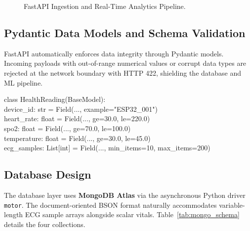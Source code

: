 \documentclass[12pt]{article}
\begin{document}
\begin{figure}[H]
\begin{tcolorbox}[tikzbox, title={FastAPI Telemetry Ingestion and Real-Time Processing Pipeline}, width=\linewidth]
{%
}
\end{tcolorbox}
\vspace{-0.2cm}
\caption{FastAPI Ingestion and Real-Time Analytics Pipeline.}
\label{fig:backend_pipeline}
\end{figure}

\subsection{Pydantic Data Models and Schema Validation}
FastAPI automatically enforces data integrity through Pydantic models. Incoming payloads with out-of-range numerical values or corrupt data types are rejected at the network boundary with HTTP 422, shielding the database and ML pipeline.

\begin{tcolorbox}[colback=black!3, colframe=black!60, arc=2pt, boxrule=0.6pt, left=5pt, right=5pt, top=2pt, bottom=2pt]
\footnotesize\ttfamily
class HealthReading(BaseModel):\\
\quad device\_id: str = Field(..., example="ESP32\_001")\\
\quad heart\_rate: float = Field(..., ge=30.0, le=220.0)\\
\quad spo2: float = Field(..., ge=70.0, le=100.0)\\
\quad temperature: float = Field(..., ge=30.0, le=45.0)\\
\quad ecg\_samples: List[int] = Field(..., min\_items=10, max\_items=200)
\end{tcolorbox}
\clearpage

\subsection{Database Design}
The database layer uses \textbf{MongoDB Atlas} via the asynchronous Python driver \texttt{motor}. The document-oriented BSON format naturally accommodates variable-length ECG sample arrays alongside scalar vitals. Table~\ref{tab:mongo_schema} details the four collections.
\end{document}
